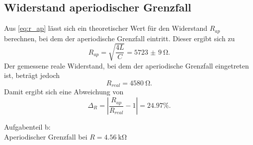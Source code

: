 \subsection{Widerstand aperiodischer Grenzfall}
Aus \autoref{eq:r_ap} lässt sich ein theoretischer Wert für den Widerstand $R_{ap}$ berechnen, bei dem der aperiodische Grenzfall eintritt.
Dieser ergibt sich zu
\begin{equation*}
  R_{ap} = \sqrt{\frac{4L}{C}} = \SI{5723(9)}{\ohm}.
\end{equation*}
Der gemessene reale Widerstand, bei dem der aperiodische Grenzfall eingetreten ist, beträgt jedoch
\begin{equation*}
  R_{real} = \SI{4580}{\ohm}.
\end{equation*}
Damit ergibt sich eine Abweichung von
\begin{equation*}
  \Delta_R = |\frac{R_{ap}}{R_{real}} - 1| = 24.97\%.
\end{equation*}












\newpage
Aufgabenteil b:\\
Aperiodischer Grenzfall bei $R = \SI{4.56}{\kilo\ohm}$
